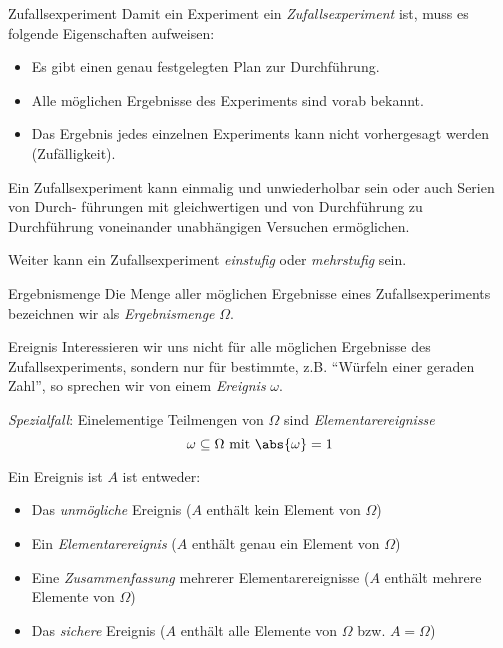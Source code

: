 \begin{defi}{Zufallsexperiment}
    Damit ein Experiment ein \emph{Zufallsexperiment} ist, muss es folgende Eigenschaften aufweisen:
    \begin{itemize}
        \item Es gibt einen genau festgelegten Plan zur Durchführung.
        \item Alle möglichen Ergebnisse des Experiments sind vorab bekannt.
        \item Das Ergebnis jedes einzelnen Experiments kann nicht vorhergesagt werden (Zufälligkeit).
    \end{itemize}
    Ein Zufallsexperiment kann einmalig und unwiederholbar sein oder auch Serien von Durch- führungen mit gleichwertigen und von Durchführung zu Durchführung voneinander unabhängigen Versuchen ermöglichen.

    Weiter kann ein Zufallsexperiment \emph{einstufig} oder \emph{mehrstufig} sein.
\end{defi}

\begin{defi}{Ergebnismenge}
    Die Menge aller möglichen Ergebnisse eines Zufallsexperiments bezeichnen wir als \emph{Ergebnismenge} $\Omega$.
\end{defi}

\begin{defi}{Ereignis}
    Interessieren wir uns nicht für alle möglichen Ergebnisse des Zufallsexperiments, sondern nur für bestimmte, z.B. \enquote{Würfeln einer geraden Zahl}, so sprechen wir von einem \emph{Ereignis} $\omega$.

    \emph{Spezialfall}: Einelementige Teilmengen von $\Omega$ sind \emph{Elementarereignisse}
    \[
        \omega \subseteq \Omega \ \text{mit} \ \abs{\omega} = 1
    \]

    Ein Ereignis ist $A$ ist entweder:
    \begin{itemize}
        \item Das \emph{unmögliche} Ereignis ($A$ enthält kein Element von $\Omega$)
        \item Ein \emph{Elementarereignis} ($A$ enthält genau ein Element von $\Omega$)
        \item Eine \emph{Zusammenfassung} mehrerer Elementarereignisse ($A$ enthält mehrere Elemente von $\Omega$)
        \item Das \emph{sichere} Ereignis ($A$ enthält alle Elemente von $\Omega$ bzw. $A = \Omega$)
    \end{itemize}
\end{defi}

